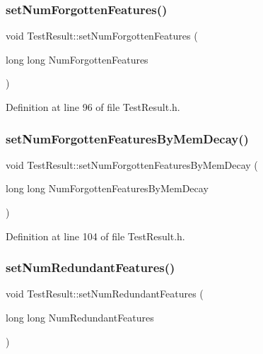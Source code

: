 \subsubsection{\texorpdfstring{set\+Num\+Forgotten\+Features()}{setNumForgottenFeatures()}}
{\footnotesize\ttfamily void Test\+Result\+::set\+Num\+Forgotten\+Features (\begin{DoxyParamCaption}\item[{long long}]{Num\+Forgotten\+Features }\end{DoxyParamCaption})\hspace{0.3cm}{\ttfamily [inline]}}



Definition at line 96 of file Test\+Result.\+h.

\mbox{\label{class_test_result_abb934e44428a188be6d86bb5a9b7b409}} 
\subsubsection{\texorpdfstring{set\+Num\+Forgotten\+Features\+By\+Mem\+Decay()}{setNumForgottenFeaturesByMemDecay()}}
{\footnotesize\ttfamily void Test\+Result\+::set\+Num\+Forgotten\+Features\+By\+Mem\+Decay (\begin{DoxyParamCaption}\item[{long long}]{Num\+Forgotten\+Features\+By\+Mem\+Decay }\end{DoxyParamCaption})\hspace{0.3cm}{\ttfamily [inline]}}



Definition at line 104 of file Test\+Result.\+h.

\mbox{\label{class_test_result_a893a356de57d3148a33f8ed437d0a0fc}} 
\subsubsection{\texorpdfstring{set\+Num\+Redundant\+Features()}{setNumRedundantFeatures()}}
{\footnotesize\ttfamily void Test\+Result\+::set\+Num\+Redundant\+Features (\begin{DoxyParamCaption}\item[{long long}]{Num\+Redundant\+Features }\end{DoxyParamCaption})\hspace{0.3cm}{\ttfamily [inline]}}



